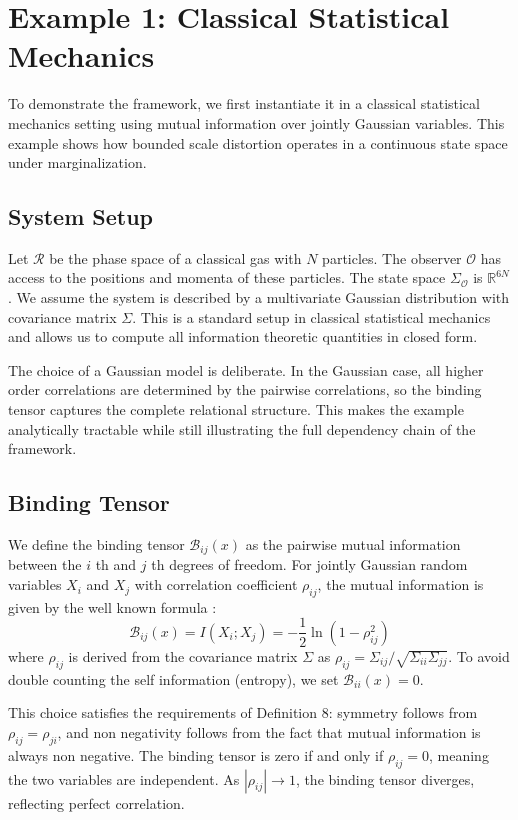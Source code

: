 \documentclass[12pt]{article}
\theoremstyle{definition}
\begin{document}
\section{Example 1: Classical Statistical Mechanics}

To demonstrate the framework, we first instantiate it in a classical statistical mechanics setting using mutual information over jointly Gaussian variables. This example shows how bounded scale distortion operates in a continuous state space under marginalization.

\subsection{System Setup}
Let $\mathcal{R}$ be the phase space of a classical gas with $N$ particles. The observer $\mathcal{O}$ has access to the positions and momenta of these particles. The state space $\Sigma_{\mathcal{O}}$ is $\mathbb{R}^{6N}$. We assume the system is described by a multivariate Gaussian distribution with covariance matrix $\Sigma$. This is a standard setup in classical statistical mechanics \cite{jaynes1957information} and allows us to compute all information theoretic quantities in closed form.

The choice of a Gaussian model is deliberate. In the Gaussian case, all higher order correlations are determined by the pairwise correlations, so the binding tensor captures the complete relational structure. This makes the example analytically tractable while still illustrating the full dependency chain of the framework.

\subsection{Binding Tensor}
We define the binding tensor $\mathcal{B}_{ij}(x)$ as the pairwise mutual information between the $i$ th and $j$ th degrees of freedom. For jointly Gaussian random variables $X_i$ and $X_j$ with correlation coefficient $\rho_{ij}$, the mutual information is given by the well known formula \cite{cover1999elements}:
\begin{equation}
\mathcal{B}_{ij}(x) = I(X_i ; X_j) = -\frac{1}{2} \ln(1 - \rho_{ij}^2)
\end{equation}
where $\rho_{ij}$ is derived from the covariance matrix $\Sigma$ as $\rho_{ij} = \Sigma_{ij} / \sqrt{\Sigma_{ii} \Sigma_{jj}}$. To avoid double counting the self information (entropy), we set $\mathcal{B}_{ii}(x) = 0$.

This choice satisfies the requirements of Definition 8: symmetry follows from $\rho_{ij} = \rho_{ji}$, and non negativity follows from the fact that mutual information is always non negative. The binding tensor is zero if and only if $\rho_{ij} = 0$, meaning the two variables are independent. As $|\rho_{ij}| \to 1$, the binding tensor diverges, reflecting perfect correlation.
\end{document}
